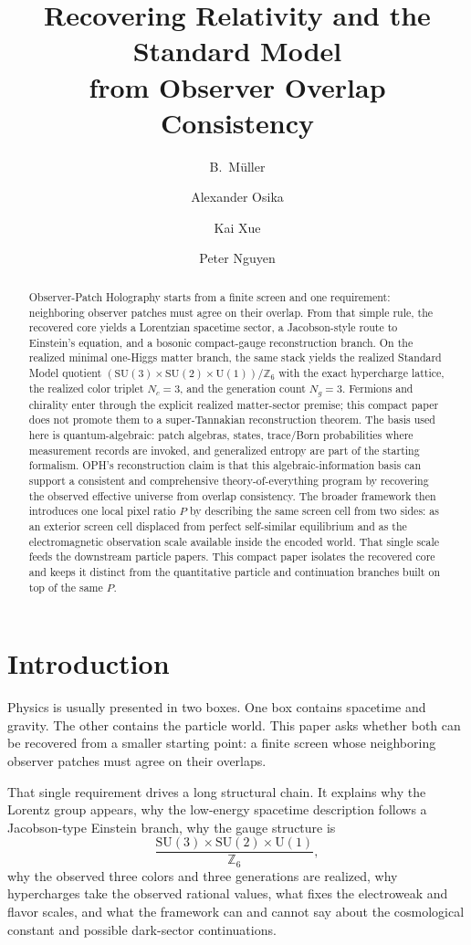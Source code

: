 \documentclass[11pt]{article}
\title{Recovering Relativity and the Standard Model\\
from Observer Overlap Consistency}
\author{B.\ M\"uller \and Alexander Osika \and Kai Xue \and Peter Nguyen}
\date{\OPHPaperReleaseDate}
\newcommand{\SU}{\mathrm{SU}}
\newcommand{\U}{\mathrm{U}}
\begin{document}
\maketitle
\OPHPaperReleaseBanner

\begin{abstract}
Observer-Patch Holography starts from a finite screen and one requirement: neighboring observer patches must agree on their overlap. From that simple rule, the recovered core yields a Lorentzian spacetime sector, a Jacobson-style route to Einstein's equation, and a bosonic compact-gauge reconstruction branch. On the realized minimal one-Higgs matter branch, the same stack yields the realized Standard Model quotient \(\left(\SU(3)\times\SU(2)\times\U(1)\right)/\mathbb Z_6\) with the exact hypercharge lattice, the realized color triplet \(N_c=3\), and the generation count \(N_g=3\). Fermions and chirality enter through the explicit realized matter-sector premise; this compact paper does not promote them to a super-Tannakian reconstruction theorem. The basis used here is quantum-algebraic: patch algebras, states, trace/Born probabilities where measurement records are invoked, and generalized entropy are part of the starting formalism. OPH's reconstruction claim is that this algebraic-information basis can support a consistent and comprehensive theory-of-everything program by recovering the observed effective universe from overlap consistency. The broader framework then introduces one local pixel ratio \(P\) by describing the same screen cell from two sides: as an exterior screen cell displaced from perfect self-similar equilibrium and as the electromagnetic observation scale available inside the encoded world. That single scale feeds the downstream particle papers. This compact paper isolates the recovered core and keeps it distinct from the quantitative particle and continuation branches built on top of the same \(P\).
\end{abstract}

\section{Introduction}

Physics is usually presented in two boxes. One box contains spacetime and gravity. The other contains the particle world. This paper asks whether both can be recovered from a smaller starting point: a finite screen whose neighboring observer patches must agree on their overlaps.

That single requirement drives a long structural chain. It explains why the Lorentz group appears, why the low-energy spacetime description follows a Jacobson-type Einstein branch, why the gauge structure is
\[
\frac{\SU(3)\times\SU(2)\times\U(1)}{\mathbb Z_6},
\]
why the observed three colors and three generations are realized, why hypercharges take the observed rational values, what fixes the electroweak and flavor scales, and what the framework can and cannot say about the cosmological constant and possible dark-sector continuations.
\end{document}
